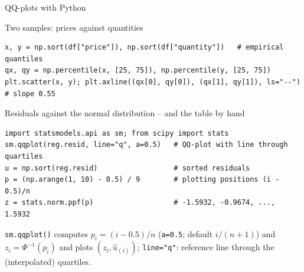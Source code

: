 \documentclass[aspectratio=169,11pt]{beamer}
\begin{document}
\begin{frame}[fragile]{QQ-plots with Python}
  \vspace{-8pt}
  \begin{block}{Two samples: prices against quantities}
\begin{lstlisting}
x, y = np.sort(df["price"]), np.sort(df["quantity"])   # empirical quantiles
qx, qy = np.percentile(x, [25, 75]), np.percentile(y, [25, 75])
plt.scatter(x, y); plt.axline((qx[0], qy[0]), (qx[1], qy[1]), ls="--")  # slope 0.55
\end{lstlisting}
  \end{block}
  \vspace{-4pt}
  \begin{block}{Residuals against the normal distribution -- and the table by hand}
\begin{lstlisting}
import statsmodels.api as sm; from scipy import stats
sm.qqplot(reg.resid, line="q", a=0.5)   # QQ-plot with line through quartiles
u = np.sort(reg.resid)                  # sorted residuals
p = (np.arange(1, 10) - 0.5) / 9        # plotting positions (i - 0.5)/n
z = stats.norm.ppf(p)                   # -1.5932, -0.9674, ..., 1.5932
\end{lstlisting}
  \end{block}
  \vspace{-4pt}
  \footnotesize \texttt{sm.qqplot()} computes $p_i=(i-0.5)/n$ (\texttt{a=0.5};
  default $i/(n+1)$) and $z_i=\Phi^{-1}(p_i)$ and plots $(z_i,\hat u_{(i)})$;
  \texttt{line="q"}: reference line through the (interpolated) quartiles.
\end{frame}
\end{document}
